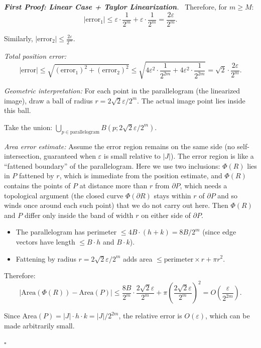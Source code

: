 \documentclass[11pt]{report}
\renewenvironment{proof}[1][Proof]{\par\noindent\textit{#1.}\ }{\hfill$\square$\par\medskip}
\begin{document}
\begin{proof}[\textbf{First Proof: Linear Case + Taylor Linearization}]
Therefore, for $m \geq M$:
\[
|\text{error}_1| \leq \varepsilon \cdot \frac{1}{2^m} + \varepsilon \cdot \frac{1}{2^m} = \frac{2\varepsilon}{2^m}.
\]

Similarly, $|\text{error}_2| \leq \frac{2\varepsilon}{2^m}$.

\textit{Total position error:}
\[
|\text{error}| \leq \sqrt{(\text{error}_1)^2 + (\text{error}_2)^2} \leq \sqrt{4\varepsilon^2 \cdot \frac{1}{2^{2m}} + 4\varepsilon^2 \cdot \frac{1}{2^{2m}}} = \sqrt{2} \cdot \frac{2\varepsilon}{2^m}.
\]

\textit{Geometric interpretation:} For each point in the parallelogram (the linearized image), draw a ball of radius $r = 2\sqrt{2} \varepsilon / 2^m$. The actual image point lies inside this ball.

Take the union: $\bigcup_{p \in \text{parallelogram}} B(p; 2\sqrt{2}\varepsilon/2^m)$.

\textit{Area error estimate:} Assume the error region remains on the same side (no self-intersection, guaranteed when $\varepsilon$ is small relative to $|J|$). The error region is like a ``fattened boundary'' of the parallelogram. Here we use two inclusions: $\Phi(R)$ lies in $P$ fattened by $r$, which is immediate from the position estimate, and $\Phi(R)$ contains the points of $P$ at distance more than $r$ from $\partial P$, which needs a topological argument (the closed curve $\Phi(\partial R)$ stays within $r$ of $\partial P$ and so winds once around each such point) that we do not carry out here. Then $\Phi(R)$ and $P$ differ only inside the band of width $r$ on either side of $\partial P$.

\begin{itemize}
    \item The parallelogram has perimeter $\leq 4B \cdot (h + k) = 8B/2^m$ (since edge vectors have length $\leq B \cdot h$ and $B \cdot k$).
    \item Fattening by radius $r = 2\sqrt{2}\varepsilon/2^m$ adds area $\leq \text{perimeter} \times r + \pi r^2$.
\end{itemize}

Therefore:
\[
|\text{Area}(\Phi(R)) - \text{Area}(P)| \leq \frac{8B}{2^m} \cdot \frac{2\sqrt{2}\varepsilon}{2^m} + \pi \left( \frac{2\sqrt{2}\varepsilon}{2^m} \right)^2 = O\left( \frac{\varepsilon}{2^{2m}} \right).
\]

Since Area$(P) = |J| \cdot h \cdot k = |J|/2^{2m}$, the relative error is $O(\varepsilon)$, which can be made arbitrarily small.


\end{proof}
\end{document}

